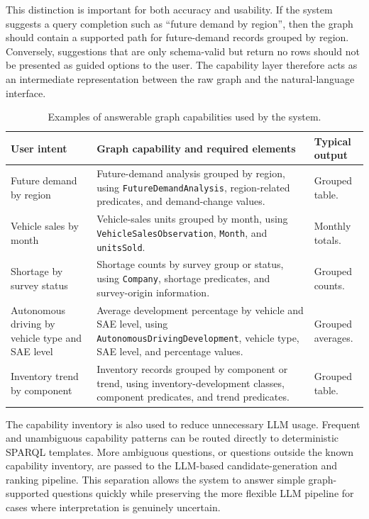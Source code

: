 \documentclass[
  12pt,
  english,
  oneside]{report}
\begin{document}
This distinction is important for both accuracy and usability. If the system suggests a query completion such as ``future demand by region'', then the graph should contain a supported path for future-demand records grouped by region. Conversely, suggestions that are only schema-valid but return no rows should not be presented as guided options to the user. The capability layer therefore acts as an intermediate representation between the raw graph and the natural-language interface.

\begin{table}[htbp]
\centering
\caption{Examples of answerable graph capabilities used by the system.}
\label{tab:capability-examples}
\small
\begin{tabularx}{\textwidth}{
>{\raggedright\arraybackslash}p{3.4cm}
>{\raggedright\arraybackslash}p{5.0cm}
>{\raggedright\arraybackslash}X
}
\toprule
\textbf{User intent} & \textbf{Graph capability and required elements} & \textbf{Typical output} \\
\midrule
Future demand by region 
& Future-demand analysis grouped by region, using \texttt{FutureDemandAnalysis}, region-related predicates, and demand-change values. 
& Grouped table. \\

Vehicle sales by month 
& Vehicle-sales units grouped by month, using \texttt{VehicleSalesObservation}, \texttt{Month}, and \texttt{unitsSold}. 
& Monthly totals. \\

Shortage by survey status 
& Shortage counts by survey group or status, using \texttt{Company}, shortage predicates, and survey-origin information. 
& Grouped counts. \\

Autonomous driving by vehicle type and SAE level 
& Average development percentage by vehicle and SAE level, using \texttt{AutonomousDrivingDevelopment}, vehicle type, SAE level, and percentage values. 
& Grouped averages. \\

Inventory trend by component 
& Inventory records grouped by component or trend, using inventory-development classes, component predicates, and trend predicates. 
& Grouped table. \\
\bottomrule
\end{tabularx}
\end{table}

The capability inventory is also used to reduce unnecessary LLM usage. Frequent and unambiguous capability patterns can be routed directly to deterministic SPARQL templates. More ambiguous questions, or questions outside the known capability inventory, are passed to the LLM-based candidate-generation and ranking pipeline. This separation allows the system to answer simple graph-supported questions quickly while preserving the more flexible LLM pipeline for cases where interpretation is genuinely uncertain.
\end{document}
